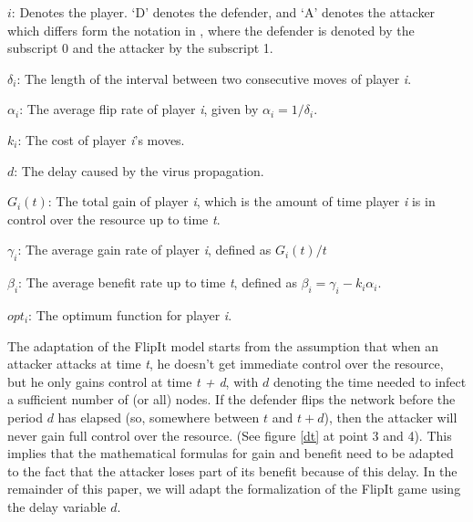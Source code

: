 \begin{description}
\item $i$: Denotes the player. `D' denotes the defender, and `A' denotes the attacker which differs form the notation in \citep{FlipIt}, where the defender is denoted by the subscript 0 and the attacker by the subscript 1.
\item $\delta_{i}$: The length of the interval between two consecutive moves of player \textit{i}. 
\item $\alpha_{i}$: The average flip rate of player \textit{i}, given by $\alpha_{i}=1/\delta_{i}$.
\item $k_{i}$: The cost of player \textit{i}'s moves.
\item $d$: The delay caused by the virus propagation.
\item $G_{i}(t)$: The total gain of player \textit{i}, which is the amount of time player \textit{i} is in control over the resource up to time \textit{t}.
\item $\gamma_{i}$: The average gain rate of player \textit{i}, defined as $G_{i}(t)/t$
\item $\beta_{i}$:  The average benefit rate up to time \textit{t}, defined as  $\beta_{i} = \gamma_{i} -k_{i} \alpha_{i} $.
\item $opt_{i}$: The optimum function for player \textit{i}. 
\end{description}

The adaptation of the FlipIt model starts from the assumption that when an attacker attacks at time \textit{t}, he doesn't get immediate control over the resource, but he only gains control at time \textit{t + d}, with $d$ denoting the time needed to infect a sufficient number of (or all) nodes. If the defender flips the network before the period $d$ has elapsed (so, somewhere between $t$ and $t + d$), then the attacker will never gain full control over the resource. (See figure \ref{dt} at point 3 and 4). This implies that the mathematical formulas for gain and benefit need to be adapted to the fact that the attacker loses part of its benefit because of this delay. In the remainder of this paper, we will adapt the formalization of the FlipIt game using the delay variable $d$. \\ 

